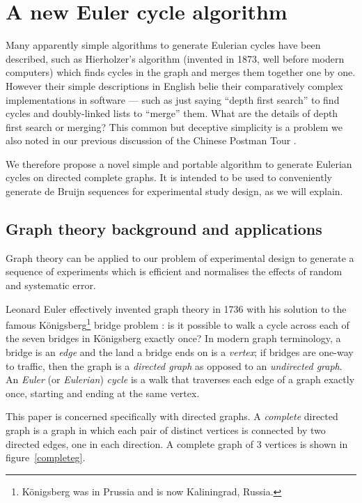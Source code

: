 \documentclass[12pt]{article}
\begin{document}
\section{A new Euler cycle algorithm}\label{new-algorithm}
Many apparently simple algorithms to generate Eulerian cycles have been described, such as Hierholzer's algorithm \cite{hierholzer} (invented in 1873, well before modern computers) which finds cycles in the graph and merges them together one by one. However their simple descriptions in English belie their comparatively complex implementations in software --- such as just saying ``depth first search'' to find cycles and doubly-linked lists to ``merge'' them. What are the details of depth first search or merging? This common but deceptive simplicity is a problem we also noted in our previous discussion of the Chinese Postman Tour \cite{cpp}. 

We therefore propose a novel simple and portable algorithm to generate Eulerian cycles on directed complete graphs. It is intended to be used to conveniently generate de Bruijn sequences for experimental study design, as we will explain. 

\subsection{Graph theory background and applications}\label{graphtheory}
Graph theory can be applied to our problem of experimental design to generate a sequence of experiments which is efficient and normalises the effects of random and systematic error.

Leonard Euler effectively invented graph theory in 1736 with his solution to the famous K\"onigsberg\footnote{K\"onigsberg was in Prussia and is now Kaliningrad, Russia.} bridge problem \cite{euler,wilson}: is it possible to walk a cycle across each of the seven bridges in K\"onigsberg exactly once? In modern graph terminology, a bridge is an \emph{edge\/} and the land a bridge ends on is a \emph{vertex\/}; if bridges are one-way to traffic, then the graph is a \emph{directed graph\/} as opposed to an \emph{undirected graph\/}. An \emph{Euler\/} (or \emph{Eulerian\/}) \emph{cycle\/} is a walk that traverses each edge of a graph exactly once, starting and ending at the same vertex.%

This paper is concerned specifically with directed graphs. A \emph{complete\/} directed graph is a graph in which each pair of distinct vertices is connected by two directed edges, one in each direction. A complete graph of 3 vertices is shown in figure~\ref{completeg}. 
\end{document}

